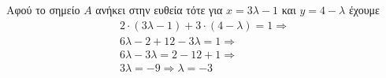 Αφού το σημείο $ A $ ανήκει στην ευθεία τότε για $ x=3\lambda-1 $ και $ y=4-\lambda $ έχουμε
\begin{gather*}
2\cdot(3\lambda-1)+3\cdot(4-\lambda)=1\Rightarrow\\
6\lambda-2+12-3\lambda=1\Rightarrow\\
6\lambda-3\lambda=2-12+1\Rightarrow\\
3\lambda=-9\Rightarrow \lambda =-3
\end{gather*}
